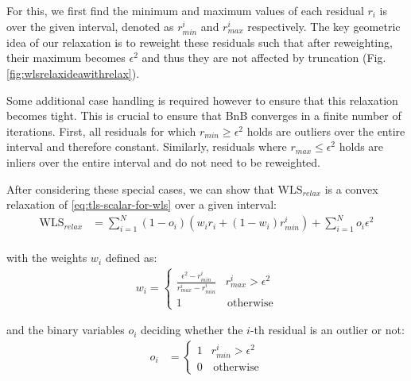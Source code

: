 For this, we first find the minimum and maximum values of each residual $r_i$ is over the given interval, denoted as $r_{min}^i$ and $r_{max}^i$ respectively. The key geometric idea of our relaxation is to reweight these residuals such that after reweighting, their maximum becomes $\epsilon^2$ and thus they are not affected by truncation (Fig. \ref{fig:wlsrelaxideawithrelax}).

Some additional case handling is required however to ensure that this relaxation becomes tight. This is crucial to ensure that BnB converges in a finite number of iterations. First, all residuals for which  $r_{min} \geq \epsilon^2$ holds are outliers over the entire interval and therefore constant. Similarly, residuals where $r_{max} \leq \epsilon^2$ holds are inliers over the entire interval and do not need to be reweighted.

After considering these special cases, we can show that $\text{WLS}_{relax}$ is a convex relaxation of \ref{eq:tls-scalar-for-wls} over a given interval:
\begin{equation}
	\label{eq:tls-wls-relaxation1}
	\begin{aligned}	
		\text{WLS}_{relax} &= 
		\sum_{i=1}^{N} (1 - o_i) \left(w_i r_i  + (1 - w_i) r_{min}^i \right) + \sum_{i=1}^{N} o_i\epsilon^2\\
	\end{aligned}
\end{equation}

with the weights $w_i$ defined as:
\begin{equation}
	\begin{aligned}	
		w_i  = 
		\begin{cases}
			\frac{\epsilon^2 - r_{min}^i}{r_{max}^i - r_{min}^i} &  r_{max}^i > \epsilon^2\\
			1 & \, \text{otherwise}
		\end{cases}
	\end{aligned}
\end{equation}

and the binary variables $o_i$ deciding whether the $i$-th residual is an outlier or not:
\begin{equation}
	\begin{aligned}	
		o_i &= \begin{cases}
			1 &  r_{min}^i > \epsilon^2\\
			0 & \, \text{otherwise}
		\end{cases}
	\end{aligned}
\end{equation}

